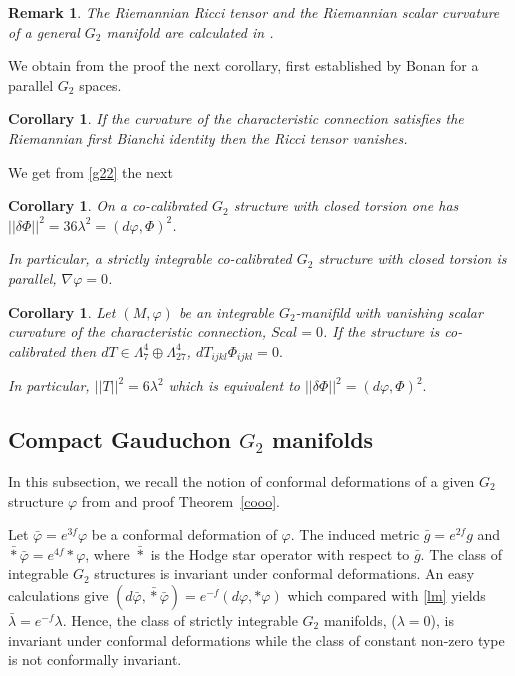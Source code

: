 \documentclass[10pt,british]{article}
\newtheorem{cor}[thrm]{Corollary}
\newtheorem{rmrk}[thrm]{Remark}
\def\sb {{\nabla}}
\def\p{{\varphi}}
\def\ph{{\Phi}}
\begin{document}
\begin{rmrk}
The Riemannian Ricci tensor and the Riemannian scalar curvature of a general $G_2$ manifold are calculated in \cite{Br1}.
\end{rmrk}
We obtain from the proof the next corollary, first established by Bonan \cite{Bo} for a parallel $G_2$ spaces.
\begin{cor}\label{corfb}
If the curvature of the characteristic connection satisfies the Riemannian first Bianchi identity then the Ricci tensor vanishes.
\end{cor}
We get from \eqref{g22} the next 
\begin{cor}
On a co-calibrated $G_2$ structure with closed torsion one has $||\delta\ph||^2=36\lambda^2=(d\p,\ph)^2$. 

In particular, a strictly  integrable co-calibrated $G_2$ structure with closed torsion is parallel, $\sb\p=0$. 
\end{cor}
\begin{cor}\label{thconj2}
Let $(M,\p)$ be an integrable  $G_2$-manifild with vanishing scalar curvature  of the characteristic connection, $Scal=0$. If the structure is co-calibrated then $dT\in\Lambda^4_7\oplus\Lambda^4_{27}$, $dT_{ijkl}\ph_{ijkl}=0.$

In particular,  $||T||^2=6\lambda^2$ which is equivalent to $||\delta\ph||^2=(d\p,\ph)^2.$

\end{cor}

\subsection{Compact  Gauduchon $G_2$ manifolds} %
In this subsection, we recall the notion of conformal deformations of a given $G_2$ structure $\p$  from \cite{FG,FI1,Kar1} and proof Theorem~\ref{cooo}. 

Let $\bar\p=e^{3f}\p$ be a conformal deformation of $\p$. The induced metric $\bar g=e^{2f}g$ and $\bar{*}\bar\p=e^{4f}*\p$, where $\bar{*}$ is the Hodge star operator with respect to $\bar{g}$. The class of integrable $G_2$ structures is invariant under conformal deformations. An easy calculations give $(d\bar\p,\bar{*}\bar\p)=e^{-f}(d\p,*\p)$ which compared with \eqref{lm} yields $\bar\lambda=e^{-f}\lambda$. Hence, the class of strictly integrable $G_2$ manifolds, ($\lambda=0$), is invariant under conformal deformations while the class of constant non-zero type is not conformally invariant.
\end{document}
